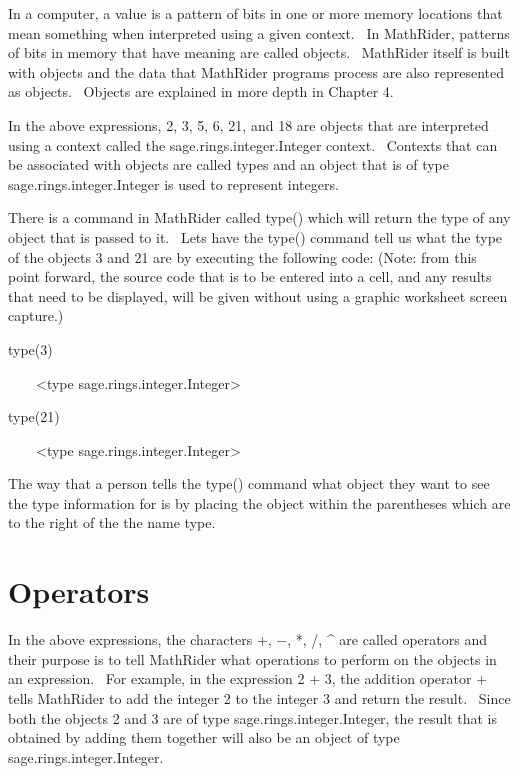 \documentclass[12pt,twoside]{book}
\begin{document}
\bigskip

In a computer, a value is a pattern of bits in one or more memory locations that mean something when interpreted using a given context. \ In MathRider, patterns of bits in memory that have meaning are called objects. \ MathRider itself is built with objects and the data that MathRider programs process are also represented as objects. \ Objects are explained in more depth in Chapter 4. 

\bigskip

In the above expressions, 2, 3, 5, 6, 21, and 18 are objects that are interpreted using a context called the sage.rings.integer.Integer context. \ Contexts that can be associated with objects are called types and an object that is of type sage.rings.integer.Integer is used to represent integers. 

\bigskip

There is a command in MathRider called type() which will return the type of any object that is passed to it. \ Lets have the type() command tell us what the type of the objects 3 and 21 are by executing the following code: (Note: from this point forward, the source code that is to be entered into a cell, and any results that need to be displayed, will be given without using a graphic worksheet screen capture.) 

\bigskip

type(3)

{\textbar}

\ \ \ \ {\textless}type {\textquotesingle}sage.rings.integer.Integer{\textquotesingle}{\textgreater}


\bigskip

type(21)

{\textbar}

\ \ \ \ {\textless}type {\textquotesingle}sage.rings.integer.Integer{\textquotesingle}{\textgreater}


\bigskip

The way that a person tells the type() command what object they want to see the type information for is by placing the object within the parentheses which are to the right of the the name {\textquotesingle}type{\textquotesingle}.

\section[Operators]{Operators}

In the above expressions, the characters +, $-$, *, /, \^{} are called operators and their purpose is to tell MathRider what operations to perform on the objects in an expression. \ For example, in the expression 2 + 3, the addition operator + tells MathRider to add the integer 2 to the integer 3 and return the result. \ Since both the objects 2 and 3 are of type sage.rings.integer.Integer, the result that is obtained by adding them together will also be an object of type sage.rings.integer.Integer. 
\end{document}

